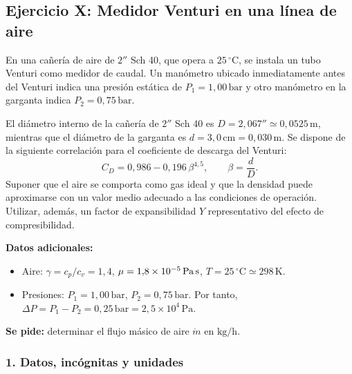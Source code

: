 \documentclass[12pt, a4paper]{article}
\begin{document}

\subsection*{Ejercicio X: Medidor Venturi en una línea de aire}

En una cañería de aire de $2''$ Sch 40, que opera a $25\,^\circ\text{C}$, se instala 
un tubo Venturi como medidor de caudal. Un manómetro ubicado inmediatamente antes del 
Venturi indica una presión estática de $P_1 = 1{,}00\,\text{bar}$ y otro manómetro 
en la garganta indica $P_2 = 0{,}75\,\text{bar}$. 

El diámetro interno de la cañería de $2''$ Sch 40 es 
$D = 2{,}067'' \simeq 0{,}0525\,\text{m}$, mientras que el diámetro de la garganta es 
$d = 3{,}0\,\text{cm} = 0{,}030\,\text{m}$. Se dispone de la siguiente correlación para 
el coeficiente de descarga del Venturi:
%
\[
C_D = 0{,}986 - 0{,}196\,\beta^{4{,}5},
\qquad
\beta = \frac{d}{D}.
\]
%
Suponer que el aire se comporta como gas ideal y que la densidad puede 
aproximarse con un valor medio adecuado a las condiciones de operación. 
Utilizar, además, un factor de expansibilidad $Y$ representativo del efecto de 
compresibilidad.

\medskip

\noindent
\textbf{Datos adicionales:}
\begin{itemize}
  \item Aire: $\gamma = c_p/c_v = 1{,}4$, $\mu = 1{,}8\times 10^{-5}\,\text{Pa\,s}$,
        $T = 25\,^\circ\text{C} \simeq 298\,\text{K}$.
  \item Presiones: $P_1 = 1{,}00\,\text{bar}$, $P_2 = 0{,}75\,\text{bar}$.
        Por tanto, $\Delta P = P_1 - P_2 = 0{,}25\,\text{bar} = 2{,}5\times 10^4\,\text{Pa}$.
\end{itemize}

\noindent
\textbf{Se pide:} determinar el flujo másico de aire $\dot m$ en $\text{kg/h}$.

\subsubsection*{1. Datos, incógnitas y unidades}
\end{document}
